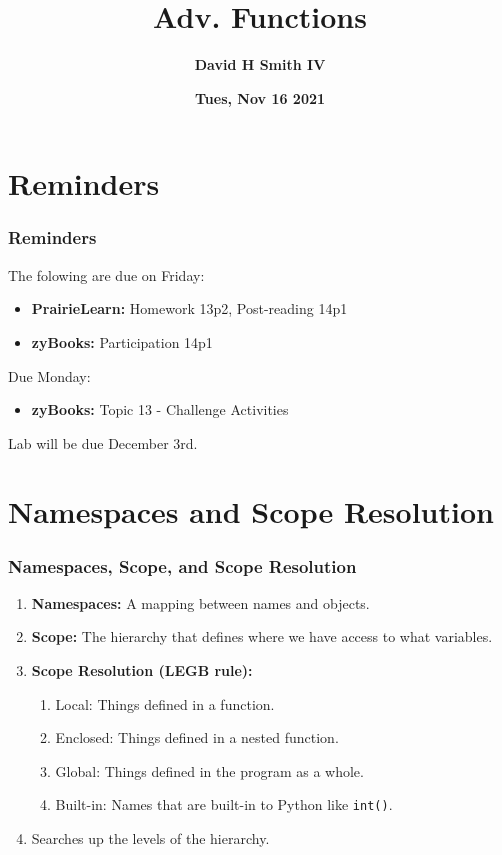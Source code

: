 \documentclass{beamer}
\title{\textbf{Adv. Functions}}
\author{\textbf{David H Smith IV}}
\institute[\textbf{UIUC}]{\textbf{University of Illinois Urbana-Champaign}}
\date{\textbf{Tues, Nov 16 2021}}
\begin{document}
\frame{\titlepage}

\section{Reminders}

%
%
\begin{frame}
  \frametitle{Reminders}
  The folowing are due on Friday:
  \begin{itemize}
    \item \textbf{PrairieLearn:} Homework 13p2, Post-reading 14p1
    \item \textbf{zyBooks:} Participation 14p1
  \end{itemize}
  \vfill
  Due Monday:
  \begin{itemize}
    \item \textbf{zyBooks:} Topic 13 - Challenge Activities 
  \end{itemize}
  \vfill
  Lab will be due December 3rd.
\end{frame}

\section{Namespaces and Scope Resolution}

%
%
\begin{frame}[fragile]
  \frametitle{Namespaces, Scope, and Scope Resolution}
  \begin{enumerate}
    \item \textbf{Namespaces: } A mapping between names and objects.
    \pause 
    \item \textbf{Scope: } The hierarchy that defines where we have access to what variables.
    \pause
    \item \textbf{Scope Resolution (LEGB rule):}
      \begin{enumerate}
        \item Local: Things defined in a function.
        \item Enclosed: Things defined in a nested function.
        \item Global: Things defined in the program as a whole.
        \item Built-in: Names that are built-in to Python like \lstinline|int()|.
      \end{enumerate}
    \pause
    \item Searches up the levels of the hierarchy.
  \end{enumerate}
\end{frame}
\end{document}
